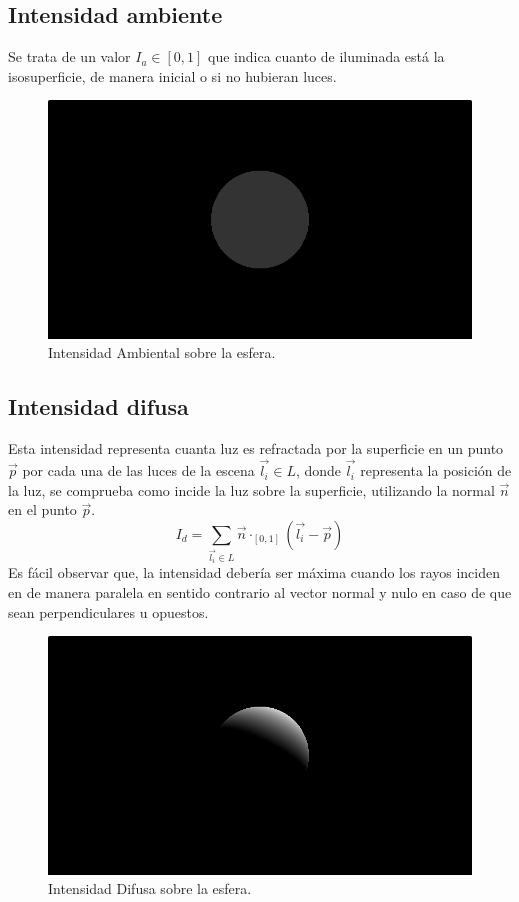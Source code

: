 \subsection{Intensidad ambiente}
Se trata de un valor \(I_a \in [0,1]\) que indica cuanto de iluminada está la isosuperficie, de manera inicial o si no hubieran luces. 
\begin{figure}[H]
  \centering
  \captionsetup{justification=centering}%
   \includegraphics[width=1.0\textwidth]{secciones/imagenes/lightmodel/ambiental.png}
  \caption{Intensidad Ambiental sobre la esfera.}
  \label{fig:ambient}
\end{figure}

\subsection{Intensidad difusa}
Esta intensidad representa cuanta luz es refractada por la superficie en un punto \(\Vec{p}\) por cada una de las luces de la escena \(\Vec{l_i}\in L\), donde \(\Vec{l_i}\) representa la posición de la luz, se comprueba como incide la luz sobre la superficie, utilizando la normal \(\Vec{n}\) en el punto \(\Vec{p}\). 
\[I_d = \sum_{\Vec{l_i}\in L} \Vec{n}\cdot_{[0, 1]}(\Vec{l_i}-\Vec{p})\]
Es fácil observar que, la intensidad debería ser máxima cuando los rayos inciden en de manera paralela en sentido contrario al vector normal y nulo en caso de que sean perpendiculares u opuestos.
\begin{figure}[H]
  \centering
  \captionsetup{justification=centering}%
  \includegraphics[width=1.0\textwidth]{secciones/imagenes/lightmodel/difusa.png}
  \caption{Intensidad Difusa sobre la esfera.}
  \label{fig:difusse}
\end{figure}
